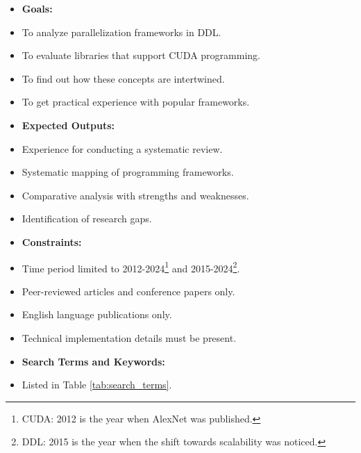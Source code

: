 \begin{itemize}
	\item \textbf{Goals:}
	\item To analyze parallelization frameworks in DDL.
	\item To evaluate libraries that support CUDA programming.
	\item To find out how these concepts are intertwined.
	\item To get practical experience with popular frameworks. \\
	\item \textbf{Expected Outputs:}
	\item Experience for conducting a systematic review.
	\item Systematic mapping of programming frameworks.
	\item Comparative analysis with strengths and weaknesses.
	\item Identification of research gaps. \\
	\item \textbf{Constraints:}
	\item Time period limited to 2012-2024\footnote{CUDA: 2012 is the year when AlexNet was published.} and
	      2015-2024\footnote{DDL: 2015 is the year when the shift towards scalability was noticed.}.
	\item Peer-reviewed articles and conference papers only.
	\item English language publications only.
	\item Technical implementation details must be present. \\
	\item \textbf{Search Terms and Keywords:}
	\item Listed in Table \ref{tab:search_terms}.
\end{itemize}


